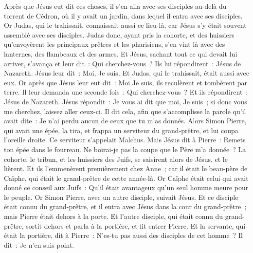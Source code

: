 \begin{multicols}{2}
\VerseOne{}Après que Jésus eut dit ces choses, il s'en alla avec ses disciples au-delà du torrent de Cédron, où il y avait un jardin, dans lequel il entra avec ses disciples.
Or Judas, qui le trahissait, connaissait aussi ce lieu-là, car Jésus s'y était souvent assemblé avec ses disciples.
Judas donc, ayant pris la cohorte, et des huissiers qu'envoyèrent les principaux prêtres et les pharisiens, s'en vint là avec des lanternes, des flambeaux et des armes.
Et Jésus, sachant tout ce qui devait lui arriver, s'avança et leur dit~: Qui cherchez-vous~?
Ils lui répondirent~: Jésus de Nazareth. Jésus leur dit~: Moi, Je suis. Et Judas, qui le trahissait, était aussi avec eux.
Or après que Jésus leur eut dit~: Moi Je suis, ils reculèrent et tombèrent par terre.
Il leur demanda une seconde fois~: Qui cherchez-vous~? Et ils répondirent~: Jésus de Nazareth.
Jésus répondit~: Je vous ai dit que moi, Je suis~; si donc vous me cherchez, laissez aller ceux-ci.
Il dit cela, afin que s'accomplisse la parole qu'il avait dite~: Je n'ai perdu aucun de ceux que tu m'as donnés.
Alors Simon Pierre, qui avait une épée, la tira, et frappa un serviteur du grand-prêtre, et lui coupa l'oreille droite. Ce serviteur s'appelait Malchus.
Mais Jésus dit à Pierre~: Remets ton épée dans le fourreau. Ne boirai-je pas la coupe que le Père m'a donnée~?
La cohorte, le tribun, et les huissiers des Juifs, se saisirent alors de Jésus, et le lièrent.
Et ils l'emmenèrent premièrement chez Anne~; car il était le beau-père de Caïphe, qui était le grand-prêtre de cette année-là.
Or Caïphe était celui qui avait donné ce conseil aux Juifs~: Qu'il était avantageux qu'un seul homme meure pour le peuple.
Or Simon Pierre, avec un autre disciple, suivait Jésus. Et ce disciple était connu du grand-prêtre, et il entra avec Jésus dans la cour du grand-prêtre~;
mais Pierre était dehors à la porte. Et l'autre disciple, qui était connu du grand-prêtre, sortit dehors et parla à la portière, et fit entrer Pierre.
Et la servante, qui était la portière, dit à Pierre~: N'es-tu pas aussi des disciples de cet homme~? Il dit~: Je n'en suis point.

\end{multicols}

